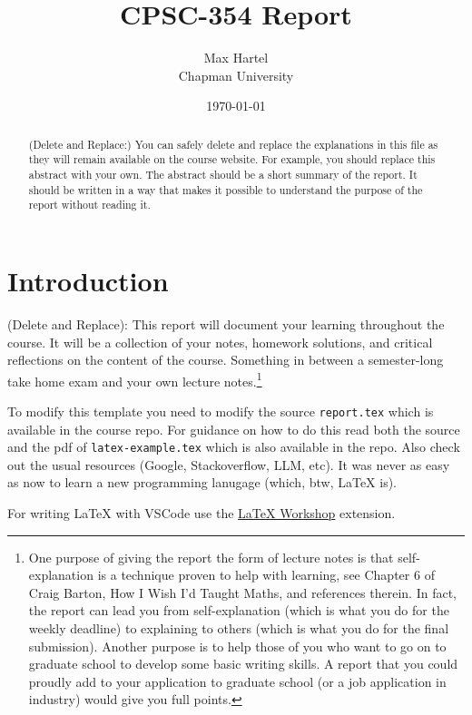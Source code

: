 \documentclass{article}
\title{CPSC-354 Report}
\author{Max Hartel  \\ Chapman University}
\date{\today}
\theoremstyle{theorem}
\theoremstyle{definition}
\theoremstyle{remark}
\begin{document}
\maketitle

\begin{abstract}
(Delete and Replace:) You can safely delete and replace the explanations in this file as they will remain available on the course website. For example, you should replace this abstract with your own. The abstract should be a short summary of the report. It should be written in a way that makes it possible to understand the purpose of the report without reading it.  
\end{abstract}

\setcounter{tocdepth}{3}
\tableofcontents

\section{Introduction}\label{intro}

(Delete and Replace): This report will document your learning throughout the course. It will be a collection of your notes, homework solutions, and critical reflections on the content of the course. Something in between a semester-long take home exam and your own lecture notes.\footnote{One purpose of giving the report the form of lecture notes is that self-explanation is a technique proven to help with learning, see Chapter 6 of Craig Barton, How I Wish I'd Taught Maths, and references therein. In fact, the report can lead you from self-explanation (which is what you do for the weekly deadline) to explaining to others (which is what you do for the final submission). Another purpose is to help those of you who want to go on to graduate school to develop some basic writing skills. A report that you could proudly add to your application to graduate school (or a job application in industry) would give you full points.}

To modify this template you need to modify the source \texttt{report.tex} which is available in the course repo. For guidance on how to do this read both the source and the pdf of \texttt{latex-example.tex} which is also available in the repo. Also check out the usual resources (Google, Stackoverflow, LLM, etc). It was never as easy as now to learn a new programming lanugage (which, btw, \LaTeX{} is).

For writing \LaTeX{} with VSCode use the \href{https://marketplace.visualstudio.com/items?itemName=James-Yu.latex-workshop}{LaTeX Workshop} extension. 
\end{document}
